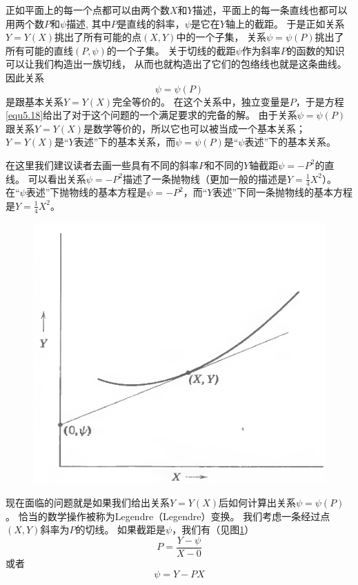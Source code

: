 正如平面上的每一个点都可以由两个数$X$和$Y$描述，平面上的每一条直线也都可以用两个数$P$和$\psi$描述,
其中$P$是直线的斜率，$\psi$是它在$Y$轴上的截距。
于是正如关系$Y=Y(X)$挑出了所有可能的点$(X,Y)$中的一个子集，
关系$\psi=\psi(P)$挑出了所有可能的直线$(P,\psi)$的一个子集。
关于切线的截距$\psi$作为斜率$P$的函数的知识可以让我们构造出一族切线，
从而也就构造出了它们的包络线也就是这条曲线。
因此关系
\begin{equation}
\label{equ5.18}
  \psi=\psi(P)
\end{equation}
是跟基本关系$Y=Y(X)$完全等价的。
在这个关系中，独立变量是$P$，于是方程\eqref{equ5.18}给出了对于这个问题的一个满足要求的完备的解。
由于关系$\psi=\psi(P)$跟关系$Y=Y(X)$是数学等价的，所以它也可以被当成一个基本关系；
$Y=Y(X)$是“$Y$表述”下的基本关系，而$\psi=\psi(P)$是“$\psi$表述”下的基本关系。

在这里我们建议读者去画一些具有不同的斜率$P$和不同的$Y$轴截距$\psi=-P^2$的直线。
可以看出关系$\psi=-P^2$描述了一条抛物线（更加一般的描述是$Y=\frac{1}{4}X^2$）。
在“$\psi$表述”下抛物线的基本方程是$\psi=-P^2$，而“$Y$表述”下同一条抛物线的基本方程是$Y=\frac{1}{4}X^2$。

\begin{figure}[htbp]
\includegraphics[width=.7\textwidth]{Pictures/fig5.6.png}
\figcaption{}
\label{fig5.6}
\end{figure}

现在面临的问题就是如果我们给出关系$Y=Y(X)$后如何计算出关系$\psi=\psi(P)$。
恰当的数学操作被称为Legendre（Legendre）变换。
我们考虑一条经过点$(X,Y)$斜率为$P$的切线。
如果截距是$\psi$，我们有（见图\ref{fig5.6}）
\begin{equation}
\label{equ5.19}
  P=\frac{Y-\psi}{X-0}
\end{equation}
或者
\begin{equation}
\label{equ5.20}
  \psi=Y-PX
\end{equation}

